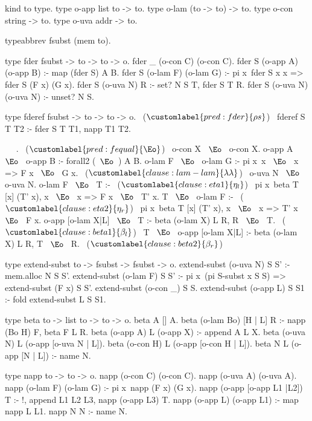\begin{elpicode}

  kind to type.
  type o-app list to -> to.
  type o-lam (to -> to) -> to.
  type o-con string -> to.
  type o-uva addr -> to.

  typeabbrev fsubst (mem to).

  type fder fsubst -> to -> to -> o.
  fder _ (o-con C) (o-con C).
  fder S (o-app A) (o-app B) :- map (fder S) A B.
  fder S (o-lam F) (o-lam G) :-
    pi x\ fder S x x => fder S (F x) (G x).
  fder S (o-uva N) R :- set? N S T, fder S T R.
  fder S (o-uva N) (o-uva N) :- unset? N S.

  type fderef fsubst -> to -> to -> o.                 ~($\customlabel{pred:fder}{\rho s}$)~
  fderef S T T2 :- fder S T T1, napp T1 T2.


  ~  ~.                              ~($\customlabel{pred:fequal}{\Eo}$)~
  o-con X ~$\Eo$~ o-con X.
  o-app A ~$\Eo$~ o-app B :- forall2 (~$\Eo$~) A B.
  o-lam F ~$\Eo$~ o-lam G :- pi x\ x ~$\Eo$~ x => F x ~$\Eo$~ G x.    ~($\customlabel{clause:lam-lam}{\lambda\lambda}$)~
  o-uva N ~$\Eo$~ o-uva N.
  o-lam F ~$\Eo$~ T :-                                       ~($\customlabel{clause:eta1}{\eta_l}$)~
    pi x\ beta T [x] (T' x), x ~$\Eo$~ x => F x ~$\Eo$~ T' x.
  T ~$\Eo$~ o-lam F :-                                       ~($\customlabel{clause:eta2}{\eta_r}$)~
    pi x\ beta T [x] (T' x), x ~$\Eo$~ x => T' x ~$\Eo$~ F x.
  o-app [o-lam X|L] ~$\Eo$~ T :- beta (o-lam X) L R, R ~$\Eo$~ T. ~($\customlabel{clause:beta1}{\beta_l}$)~
  T ~$\Eo$~ o-app [o-lam X|L] :- beta (o-lam X) L R, T ~$\Eo$~ R. ~($\customlabel{clause:beta2}{\beta_r}$)~

  type extend-subst to -> fsubst -> fsubst -> o.
  extend-subst (o-uva N) S S' :- mem.alloc N S S'.
  extend-subst (o-lam F) S S' :-
    pi x\ (pi S\extend-subst x S S) => extend-subst (F x) S S'.
  extend-subst (o-con _) S S.
  extend-subst (o-app L) S S1 :- fold extend-subst L S S1.

  type beta to -> list to -> to -> o.
  beta A [] A.
  beta (o-lam Bo) [H | L] R :- napp (Bo H) F, beta F L R.
  beta (o-app A) L (o-app X) :- append A L X.
  beta (o-uva N) L (o-app [o-uva N | L]).
  beta (o-con H) L (o-app [o-con H | L]).
  beta N L (o-app [N | L]) :- name N.

  type napp to -> to -> o.
  napp (o-con C) (o-con C).
  napp (o-uva A) (o-uva A).
  napp (o-lam F) (o-lam G) :- pi x\ napp (F x) (G x).
  napp (o-app [o-app L1 |L2]) T :- !,
    append L1 L2 L3, napp (o-app L3) T.
  napp (o-app L) (o-app L1) :- map napp L L1.
  napp N N :- name N.


\end{elpicode}
